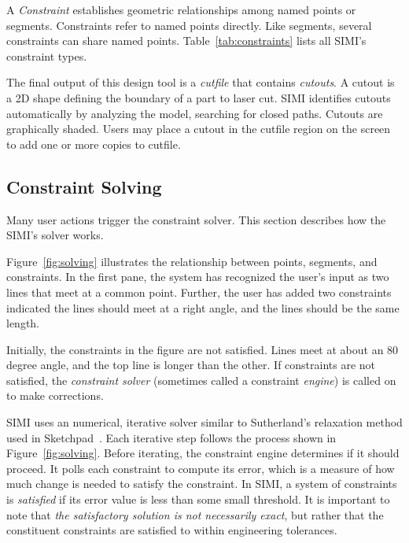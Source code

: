 
A \textit{Constraint} establishes geometric relationships among named
points or segments. Constraints refer to named points directly. Like
segments, several constraints can share named
points. Table~\ref{tab:constraints} lists all SIMI's constraint types.


The final output of this design tool is a \textit{cutfile} that
contains \textit{cutouts}. A cutout is a 2D shape defining the
boundary of a part to laser cut. SIMI identifies cutouts automatically
by analyzing the model, searching for closed paths. Cutouts are
graphically shaded. Users may place a cutout in the cutfile region on
the screen to add one or more copies to cutfile.

\subsection{Constraint Solving}

Many user actions trigger the constraint solver. This section
describes how the SIMI's solver works.

Figure~\ref{fig:solving} illustrates the relationship between points,
segments, and constraints. In the first pane, the system has
recognized the user's input as two lines that meet at a common
point. Further, the user has added two constraints indicated the lines
should meet at a right angle, and the lines should be the same length.

Initially, the constraints in the figure are not satisfied. Lines meet
at about an 80 degree angle, and the top line is longer than the
other. If constraints are not satisfied, the \textit{constraint
  solver} (sometimes called a constraint \textit{engine}) is called on
to make corrections.

SIMI uses an numerical, iterative solver similar to Sutherland's
relaxation method used in Sketchpad~\cite{sutherland-sketchpad}. Each
iterative step follows the process shown in
Figure~\ref{fig:solving}. Before iterating, the constraint engine
determines if it should proceed. It polls each constraint to compute
its error, which is a measure of how much change is needed to satisfy
the constraint. In SIMI, a system of constraints is \textit{satisfied}
if its error value is less than some small threshold. It is important
to note that \textit{the satisfactory solution is not necessarily
  exact}, but rather that the constituent constraints are satisfied to
within engineering tolerances.

